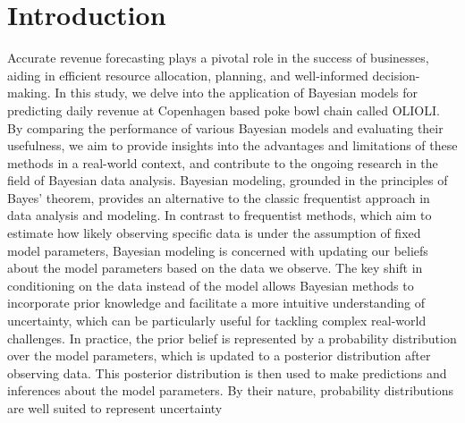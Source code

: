 \section{Introduction}


Accurate revenue forecasting plays a pivotal role in the success of businesses,
aiding in efficient resource allocation, planning, and well-informed
decision-making. In this study, we delve into the application of Bayesian
models for predicting daily revenue at Copenhagen based poke bowl chain called
OLIOLI. By comparing the performance of various Bayesian models and evaluating
their usefulness, we aim to provide insights into the advantages and
limitations of these methods in a real-world context, and contribute to the
ongoing research in the field of Bayesian data analysis.
Bayesian modeling, grounded in the principles of Bayes' theorem, provides an
alternative to the classic frequentist approach in data analysis and modeling.
In contrast to frequentist methods, which aim to estimate how likely observing
specific data is under the assumption of fixed model parameters, Bayesian
modeling is concerned with updating our beliefs about the model parameters
based on the data we observe. The key shift in conditioning on the data
instead of the model allows Bayesian methods to incorporate prior knowledge and
facilitate a more intuitive understanding of uncertainty, which can be
particularly useful for tackling complex real-world challenges.
In practice, the prior belief is represented by a probability distribution over
the model parameters, which is updated to a posterior distribution after
observing data. This posterior distribution is then used to make predictions
and inferences about the model parameters. By their nature, probability
distributions are well suited to represent uncertainty 

